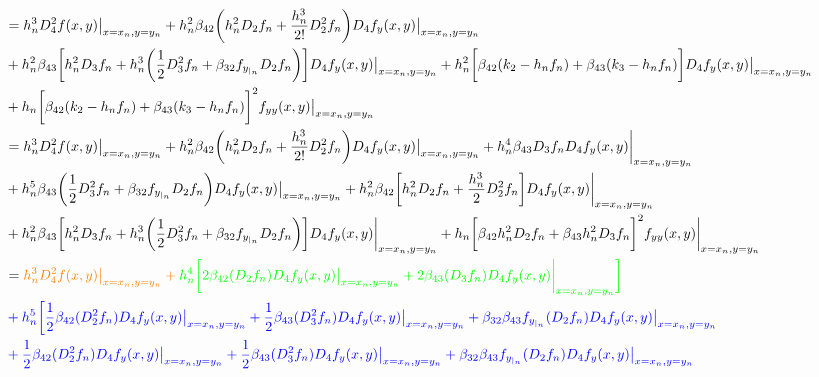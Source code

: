 \documentclass[12 pt]{article}
\begin{document}
\begin{align*}
		&= h_{n}^{3}D_{4}^{2}f(x,y)\big\vert_{x = x_{n}, y= y_{n}} +  h_{n}^{2}\beta_{42}\bigg(h_{n}^{2}D_{2}f_{n}+\frac{h_{n}^{3}}{2!}D_{2}^{2}f_{n}\bigg)D_{4}f_{y}(x,y)\big\vert_{x = x_{n}, y= y_{n}} \\
		&+ h_{n}^{2}\beta_{43}\bigg[h_{n}^{2}D_{3}f_{n}+ h_{n}^{3}\bigg(\frac{1}{2}D_{3}^{2}f_{n}+\beta_{32}f_{y_{|_{n}}}D_{2}f_{n}\bigg)\bigg]D_{4}f_{y}(x,y)\big\vert_{x = x_{n}, y= y_{n}} + h_{n}^{2}\bigg[\beta_{42}(k_{2}- h_{n}f_{n}) + \beta_{43}(k_{3}-h_{n}f_{n})\bigg]D_{4}f_{y}(x,y)\big\vert_{x = x_{n}, y= y_{n}}\\
		&+ h_{n}\bigg[\beta_{42}(k_{2}-h_{n}f_{n}) + \beta_{43}(k_{3}-h_{n}f_{n})\bigg]^{2}f_{yy}(x,y)\big\vert_{x = x_{n}, y= y_{n}}\\
		&= h_{n}^{3}D_{4}^{2}f(x,y)\big\vert_{x = x_{n}, y= y_{n}} +  h_{n}^{2}\beta_{42}\bigg(h_{n}^{2}D_{2}f_{n}+\frac{h_{n}^{3}}{2!}D_{2}^{2}f_{n}\bigg)D_{4}f_{y}(x,y)\big\vert_{x = x_{n}, y= y_{n}} + h_{n}^{4}\beta_{43}D_{3}f_{n}D_{4}f_{y}(x,y)\bigg\vert_{x=x_{n}, y= y_{n}}\\
		&+ h_{n}^{5}\beta_{43}\bigg(\frac{1}{2}D_{3}^{2}f_{n}+\beta_{32}f_{y_{|_{n}}}D_{2}f_{n}\bigg)D_{4}f_{y}(x,y)\big\vert_{x = x_{n}, y= y_{n}} + h_{n}^{2}\beta_{42}\bigg[h_{n}^{2}D_{2}f_{n} + \frac{h_{n}^{3}}{2}D_{2}^{2}f_{n}\bigg]D_{4}f_{y}(x,y)\bigg\vert_{x=x_{n}, y= y_{n}}\\
		&+ h_{n}^{2}\beta_{43}\bigg[h_{n}^{2}D_{3}f_{n}+h_{n}^{3}\bigg(\frac{1}{2}D_{3}^{2}f_{n}+\beta_{32}f_{y_{|_{n}}}D_{2}f_{n}\bigg)\bigg]D_{4}f_{y}(x,y)\bigg\vert_{x=x_{n}, y= y_{n}} + h_{n}\bigg[\beta_{42}h_{n}^{2}D_{2}f_{n} + \beta_{43}h_{n}^{2}D_{3}f_{n}\bigg]^{2}f_{yy}(x,y)\bigg\vert_{x=x_{n}, y= y_{n}}\\
		&= \color{orange}h_{n}^{3}D_{4}^{2}f(x,y)\big\vert_{x = x_{n}, y= y_{n}} + \color{green}h_{n}^{4}\bigg[2\beta_{42}(D_{2}f_{n})D_{4}f_{y}(x,y)\big\vert_{x = x_{n}, y= y_{n}} + 2\beta_{43}(D_{3}f_{n})D_{4}f_{y}(x,y)\bigg\vert_{x=x_{n}, y= y_{n}} \bigg]\\
		&\color{blue}+ h_{n}^{5}\bigg[\frac{1}{2}\beta_{42}(D_{2}^{2}f_{n})D_{4}f_{y}(x,y)\big\vert_{x = x_{n}, y= y_{n}} + \frac{1}{2}\beta_{43}(D_{3}^{2}f_{n})D_{4}f_{y}(x,y)\big\vert_{x = x_{n}, y= y_{n}} + \beta_{32}\beta_{43}f_{y_{|_{n}}}(D_{2}f_{n})D_{4}f_{y}(x,y)\big\vert_{x = x_{n}, y= y_{n}}\\
		&\color{blue}+\frac{1}{2}\beta_{42}(D_{2}^{2}f_{n})D_{4}f_{y}(x,y)\big\vert_{x = x_{n}, y= y_{n}} + \frac{1}{2}\beta_{43}(D_{3}^{2}f_{n})D_{4}f_{y}(x,y)\big\vert_{x = x_{n}, y= y_{n}} + \beta_{32}\beta_{43}f_{y_{|_{n}}}(D_{2}f_{n})D_{4}f_{y}(x,y)\big\vert_{x = x_{n}, y= y_{n}}\\

\end{align*}
\end{document}
